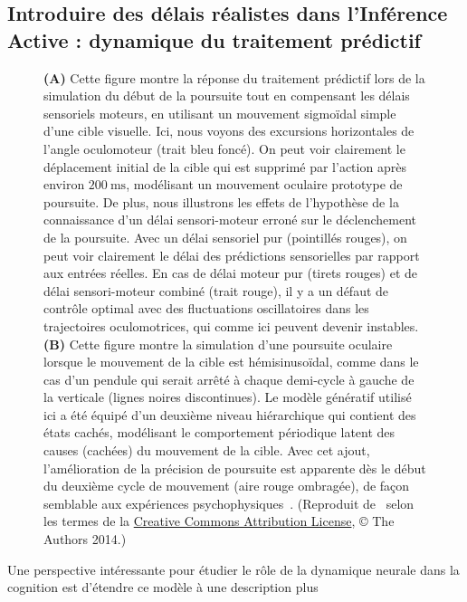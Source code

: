 \documentclass[11pt,french,a4paper,oneside]{article}%
\newcommand{\ms}{\si{\milli\second}}%
\begin{document}
\subsection{Introduire des délais réalistes dans l'Inférence Active : dynamique du
traitement prédictif}
\begin{figure}%
\caption{\textbf{(A)} Cette figure montre la réponse du traitement
prédictif lors de la simulation du début de la poursuite tout en
compensant les délais sensoriels moteurs, en utilisant un mouvement sigmoïdal simple
d'une cible visuelle. Ici, nous voyons des excursions horizontales de
l'angle oculomoteur (trait bleu foncé). On peut voir clairement le
déplacement initial de la cible qui est supprimé par l'action après
environ $200~\ms$, modélisant un mouvement oculaire prototype de poursuite.
De plus, nous illustrons les effets de l'hypothèse de la connaissance d'un délai
sensori-moteur erroné sur le déclenchement de la poursuite. Avec
un délai sensoriel pur (pointillés rouges), on peut voir
clairement le délai des prédictions sensorielles par rapport aux
entrées réelles. En cas de délai moteur pur (tirets rouges) et de délai sensori-moteur combiné (trait rouge), il y a un
défaut de contrôle optimal avec des fluctuations oscillatoires dans les
trajectoires oculomotrices, qui comme ici peuvent devenir instables. \textbf{(B)}
Cette figure montre la simulation d'une poursuite oculaire lorsque le
mouvement de la cible est hémisinusoïdal, comme dans le cas d'un pendule
qui serait arrêté à chaque demi-cycle à gauche de la verticale (lignes
noires discontinues). Le modèle génératif utilisé ici a été équipé d'un
deuxième niveau hiérarchique qui contient des états cachés, modélisant
le comportement périodique latent des causes (cachées) du mouvement de
la cible. Avec cet ajout, l'amélioration de la précision de poursuite
est apparente dès le début du deuxième cycle de mouvement (aire
rouge ombragée), de façon semblable aux expériences psychophysiques~\citep{Barnes91}. (Reproduit de~\citep{PerrinetAdamsFriston14} selon
les termes de la
\href{https://link.springer.com/article/10.1007/s00422-014-0620-8\#copyrightInformation}{Creative
Commons Attribution License}, © The Authors 2014.)
}
\label{fig:PerrinetAdamsFriston14}
\end{figure}
Une perspective intéressante pour étudier le rôle de la dynamique
neurale dans la cognition est d'étendre ce modèle à une description plus
\end{document}

